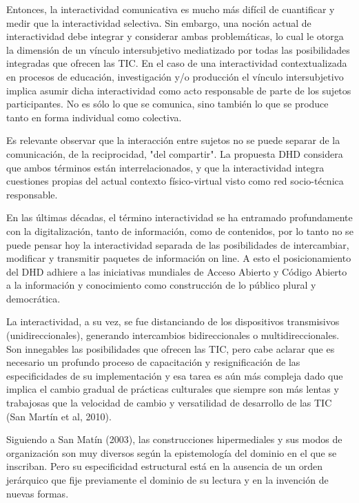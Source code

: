 Entonces, la interactividad comunicativa es mucho más difícil de cuantificar y medir que la interactividad
selectiva. Sin embargo, una noción actual de interactividad debe integrar y considerar ambas problemáticas, lo cual le otorga la dimensión de un vínculo intersubjetivo mediatizado por todas las posibilidades integradas que ofrecen las TIC.
En el caso de una interactividad contextualizada en procesos de educación, investigación y/o producción el vínculo intersubjetivo implica asumir dicha interactividad como acto responsable de parte de los sujetos participantes. No es sólo lo que se comunica, sino también lo que se produce tanto en forma individual como colectiva.

Es relevante observar que la interacción entre sujetos no se
puede separar de la comunicación, de la reciprocidad, "del compartir". La propuesta DHD
considera que ambos términos están interrelacionados, y que la interactividad
integra cuestiones propias del actual contexto físico-virtual visto como red
socio-técnica responsable.

En las últimas décadas, el término interactividad se ha entramado profundamente con la
digitalización, tanto de información, como de contenidos, por lo tanto no se puede pensar hoy
la interactividad separada de las posibilidades de intercambiar, modificar y
transmitir paquetes de información on line. A esto el posicionamiento del DHD adhiere a las iniciativas mundiales de Acceso Abierto y Código Abierto a la información y conocimiento como construcción de lo público plural y democrática.

La interactividad, a su vez, se fue distanciando de los dispositivos
transmisivos (unidireccionales), generando intercambios bidireccionales o
multidireccionales. Son innegables las posibilidades que ofrecen las TIC, pero cabe aclarar que
es necesario un profundo proceso de capacitación y resignificación de las
especificidades de su implementación y esa tarea es aún más compleja dado que implica el cambio gradual de prácticas culturales que siempre son más lentas y trabajosas que la velocidad de cambio y versatilidad de desarrollo de las TIC (San Martín et al, 2010).

Siguiendo a San Matín (2003), las construcciones hipermediales y sus modos de organización son muy
diversos según la epistemología del dominio en el que se inscriban. Pero su
especificidad estructural está en la ausencia de un orden jerárquico que fije
previamente el dominio de su lectura y en la invención de nuevas formas.

